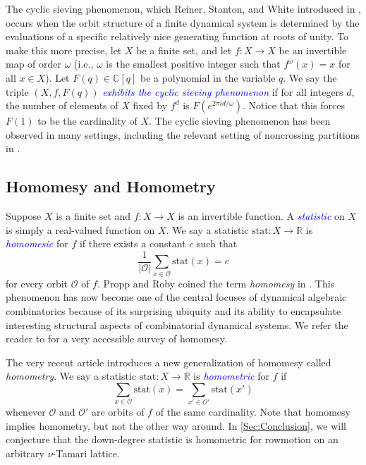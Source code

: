 \documentclass[11pt]{amsart}
\theoremstyle{definition}
\newcommand{\dfn}[1]{\textcolor{blue}{\emph{#1}}}
\begin{document}
The cyclic sieving phenomenon, which Reiner, Stanton, and White introduced in \cite{CSPDefinition}, occurs when the orbit structure of a finite dynamical system is determined by the evaluations of a specific relatively nice generating function at roots of unity. To make this more precise, let $X$ be a finite set, and let $f\colon X\to X$ be an invertible map of order $\omega$ (i.e., $\omega$ is the smallest positive integer such that $f^\omega(x)=x$ for all $x\in X$). Let $F(q)\in\mathbb C[q]$ be a polynomial in the variable $q$. We say the triple $(X,f,F(q))$ \dfn{exhibits the cyclic sieving phenomenon} if for all integers $d$, the number of elements of $X$ fixed by $f^d$ is $F(e^{2\pi id/\omega})$. Notice that this forces $F(1)$ to be the cardinality of $X$. The cyclic sieving phenomenon has been observed in many settings, including the relevant setting of noncrossing partitions in \cite{BodnarRhoades}.

\subsection{Homomesy and Homometry}\label{Sec:Homomesy}

Suppose $X$ is a finite set and $f\colon X\to X$ is an invertible function. A \dfn{statistic} on $X$ is simply a real-valued function on $X$. We say a statistic $\text{stat}\colon X\to\mathbb R$ is \dfn{homomesic} for $f$ if there exists a constant $c$ such that \[\frac{1}{|\mathcal O|}\sum_{x\in\mathcal O}\text{stat}(x)=c\] for every orbit $\mathcal O$ of $f$. Propp and Roby coined the term \emph{homomesy} in \cite{ProppRoby}. This phenomenon has now become one of the central focuses of dynamical algebraic combinatorics because of its surprising ubiquity and its ability to encapsulate interesting structural aspects of combinatorial dynamical systems. We refer the reader to \cite{Roby} for a very accessible survey of homomesy. 

The very recent article \cite{ElizaldeFences} introduces a new generalization of homomesy called \emph{homometry}. We say a statistic $\text{stat}\colon X\to \mathbb R$ is \dfn{homometric} for $f$ if \[\sum_{x\in\mathcal O}\text{stat}(x)=\sum_{x'\in\mathcal O'}\text{stat}(x')\] whenever $\mathcal O$ and $\mathcal O'$ are orbits of $f$ of the same cardinality. Note that homomesy implies homometry, but not the other way around. In \cref{Sec:Conclusion}, we will conjecture that the down-degree statistic is homometric for rowmotion on an arbitrary $\nu$-Tamari lattice. 
\end{document}
